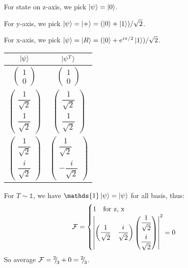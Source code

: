 \begin{parts}
	For state on z-axis, we pick $\ket{\psi} = \ket{0}$.
	
	For y-axis, we pick $\ket{\psi} = \ket{+} = (\ket{0} + \ket{1})/\sqrt{2}$.
	
	For x-axis, we pick $\ket{\psi} = \ket{R} = (\ket{0} + \mathrm{e}^{i\pi/2}\ket{1})/\sqrt{2}$.
	
	\begin{center}
		\begin{tabular}{|c|c|}
			\hline
			$\ket{\psi}$ & $\ket{\psi^T}$ \\
			\hline
			$\begin{pmatrix}
				1 \\ 0
			\end{pmatrix}$ &
			$\begin{pmatrix}
				1 \\ 0
			\end{pmatrix}$ \\
			$\begin{pmatrix}
				\dfrac{1}{\sqrt{2}} \\[1em] \dfrac{1}{\sqrt{2}}
			\end{pmatrix}$ &
			$\begin{pmatrix}
				\dfrac{1}{\sqrt{2}} \\[1em] \dfrac{1}{\sqrt{2}}
			\end{pmatrix}$ \\
			$\begin{pmatrix}
				\dfrac{1}{\sqrt{2}} \\[1em] \dfrac{i}{\sqrt{2}}
			\end{pmatrix}$ &
			$\begin{pmatrix}
				\dfrac{1}{\sqrt{2}} \\[1em] -\dfrac{i}{\sqrt{2}}
			\end{pmatrix}$ \\
			\hline
		\end{tabular}
	\end{center}
	
	For $T \sim \mathds{1}$, we have $\mathds{1}\ket{\psi} = \ket{\psi}$ for all basis, thus:
	\begin{equation*}
		\mathcal{F} =
		\begin{cases}
			1 \textnormal{\hspace{1em}for z, x} \\
			\left|\begin{pmatrix}
				\dfrac{1}{\sqrt{2}} & \dfrac{i}{\sqrt{2}}
			\end{pmatrix}
			\begin{pmatrix}
				\dfrac{1}{\sqrt{2}} \\[1em] \dfrac{i}{\sqrt{2}}
			\end{pmatrix}
			\right|^2 = 0
		\end{cases}
	\end{equation*}
	So average $\mathcal{F} = {{}^{2}{\mskip -5mu/\mskip -3mu}_{3}} + 0 = {{}^{2}{\mskip -5mu/\mskip -3mu}_{3}}$.
	

\end{parts}
